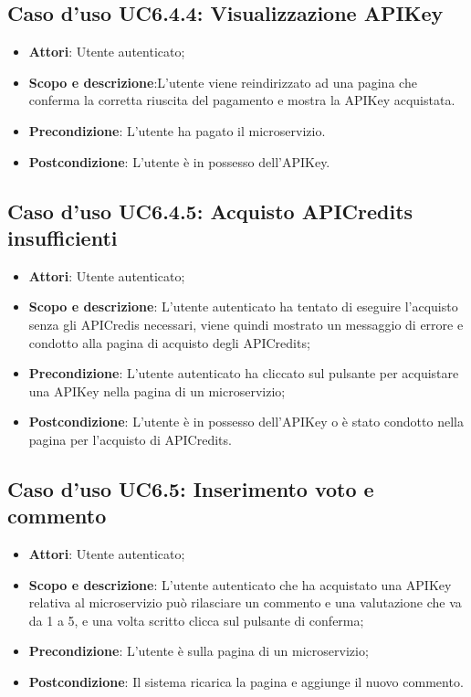 \documentclass[12pt,a4paper,titlepage]{article}
\begin{document}
	\subsection{Caso d'uso UC6.4.4: Visualizzazione APIKey}
	\label{UC6.4.4}
	\begin{itemize}
		\item \textbf{Attori}: Utente autenticato;
		\item \textbf{Scopo e descrizione}:L'utente viene reindirizzato ad una pagina che conferma la corretta riuscita del pagamento e mostra la APIKey acquistata.
		\item \textbf{Precondizione}: L'utente ha pagato il microservizio.
		\item \textbf{Postcondizione}: L'utente è in possesso dell'APIKey.
	\end{itemize}
	\subsection{Caso d'uso UC6.4.5: Acquisto APICredits insufficienti}
	\label{UC6.4.5}
	\begin{itemize}
		\item \textbf{Attori}: Utente autenticato;
		\item \textbf{Scopo e descrizione}: L'utente autenticato ha tentato di eseguire l'acquisto senza gli APICredis necessari, viene quindi mostrato un messaggio di errore e condotto alla pagina di acquisto degli APICredits;
		\item \textbf{Precondizione}: L'utente autenticato ha cliccato sul pulsante per acquistare una APIKey nella pagina di un microservizio;
		\item \textbf{Postcondizione}: L'utente è in possesso dell'APIKey o è stato condotto nella pagina per l'acquisto di APICredits.
	\end{itemize}
	\subsection{Caso d'uso UC6.5: Inserimento voto e commento}
	\label{UC6.5}
	\begin{itemize}
		\item \textbf{Attori}: Utente autenticato;
		\item \textbf{Scopo e descrizione}: L'utente autenticato che ha acquistato una APIKey relativa al microservizio può rilasciare un commento e una valutazione che va da 1 a 5, e una volta scritto clicca sul pulsante di conferma;
		\item \textbf{Precondizione}: L'utente è sulla pagina di un microservizio;
		\item \textbf{Postcondizione}: Il sistema ricarica la pagina e aggiunge il nuovo commento.
	\end{itemize}
\end{document}
